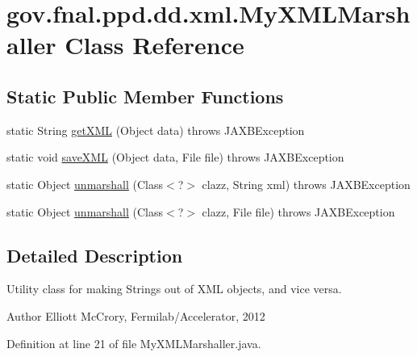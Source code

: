 \hypertarget{classgov_1_1fnal_1_1ppd_1_1dd_1_1xml_1_1MyXMLMarshaller}{\section{gov.\-fnal.\-ppd.\-dd.\-xml.\-My\-X\-M\-L\-Marshaller Class Reference}
\label{classgov_1_1fnal_1_1ppd_1_1dd_1_1xml_1_1MyXMLMarshaller}
}
\subsection*{Static Public Member Functions}
\begin{DoxyCompactItemize}
\item 
static String \hyperlink{classgov_1_1fnal_1_1ppd_1_1dd_1_1xml_1_1MyXMLMarshaller_a81528df65c4fd7426091e36416e1913f}{get\-X\-M\-L} (Object data)  throws J\-A\-X\-B\-Exception 
\item 
static void \hyperlink{classgov_1_1fnal_1_1ppd_1_1dd_1_1xml_1_1MyXMLMarshaller_aebf26fd9fce0e6866d13c36ed36408d0}{save\-X\-M\-L} (Object data, File file)  throws J\-A\-X\-B\-Exception 
\item 
static Object \hyperlink{classgov_1_1fnal_1_1ppd_1_1dd_1_1xml_1_1MyXMLMarshaller_a7b08a6b71a1603e3f4eb7dea6f0402b3}{unmarshall} (Class$<$?$>$ clazz, String xml)  throws J\-A\-X\-B\-Exception 
\item 
static Object \hyperlink{classgov_1_1fnal_1_1ppd_1_1dd_1_1xml_1_1MyXMLMarshaller_a5d210178cc498d18018e6bf535617724}{unmarshall} (Class$<$?$>$ clazz, File file)  throws J\-A\-X\-B\-Exception 
\end{DoxyCompactItemize}


\subsection{Detailed Description}
Utility class for making Strings out of X\-M\-L objects, and vice versa.

\begin{DoxyAuthor}{Author}
Elliott Mc\-Crory, Fermilab/\-Accelerator, 2012 
\end{DoxyAuthor}


Definition at line 21 of file My\-X\-M\-L\-Marshaller.\-java.



